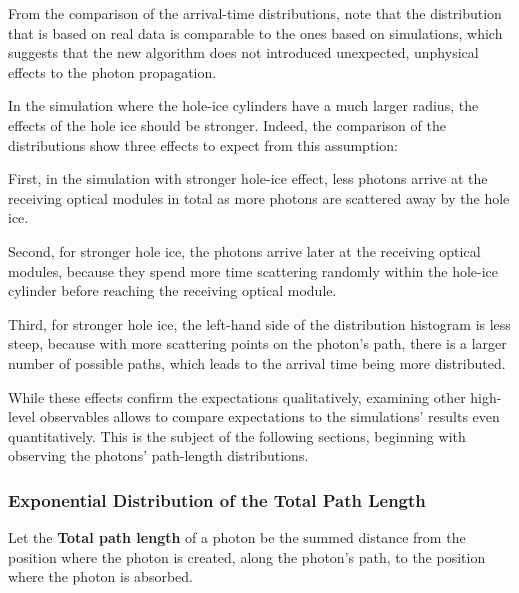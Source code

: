 From the comparison of the arrival-time distributions, note that the distribution that is based on real data is comparable to the ones based on simulations, which suggests that the new algorithm does not introduced unexpected, unphysical effects to the photon propagation.


In the simulation where the hole-ice cylinders have a much larger radius, the effects of the hole ice should be stronger. Indeed, the comparison of the distributions show three effects to expect from this assumption:

First, in the simulation with stronger hole-ice effect, less photons arrive at the receiving optical modules in total as more photons are scattered away by the hole ice.

Second, for stronger hole ice, the photons arrive later at the receiving optical modules, because they spend more time scattering randomly within the hole-ice cylinder before reaching the receiving optical module.

Third, for stronger hole ice, the left-hand side of the distribution histogram is less steep, because with more scattering points on the photon's path, there is a larger number of possible paths, which leads to the arrival time being more distributed.

While these effects confirm the expectations qualitatively, examining other high-level observables allows to compare expectations to the simulations' results even quantitatively. This is the subject of the following sections, beginning with observing the photons' path-length distributions.


\subsubsection{Exponential Distribution of the Total Path Length}
\label{sec:total_path_length_distribution}


Let the \textbf{Total path length} of a photon be the summed distance from the position where the photon is created, along the photon's path, to the position where the photon is absorbed.


